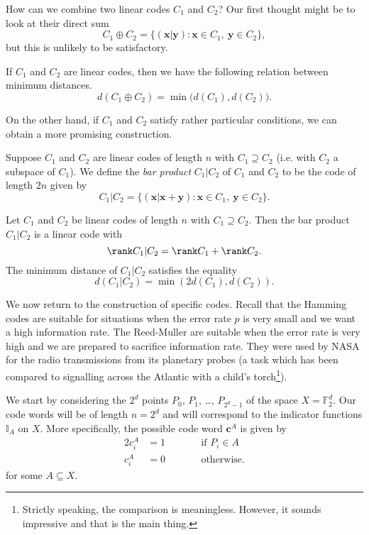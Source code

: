 How can we combine two linear codes $C_{1}$ and $C_{2}$?
Our first thought might be to look at their
direct sum
\[C_{1}\oplus C_{2}=\{({\mathbf x}|{\mathbf y})
:{\mathbf x}\in C_{1},\ {\mathbf y}\in C_{2}\},\]
but this is unlikely to be satisfactory.
\begin{lemma} If $C_{1}$ and $C_{2}$ are linear codes,
then we have the following relation between
minimum distances.
\[d(C_{1}\oplus C_{2})=\min\big(d(C_{1}),d(C_{2})\big).\]
\end{lemma}
On the other hand, if $C_{1}$ and $C_{2}$ satisfy
rather particular conditions, we can obtain
a more promising construction.
\begin{definition} Suppose $C_{1}$ and $C_{2}$
are linear codes of length $n$
with $C_{1}\supseteq C_{2}$
(i.e. with $C_{2}$ a subspace of $C_{1}$). We define
the \emph{bar product} $C_{1}|C_{2}$ of $C_{1}$
and $C_{2}$ to be the code of length $2n$ given by
\[C_{1}|C_{2}=\{({\mathbf x}|{\mathbf x}+{\mathbf y})
:{\mathbf x}\in C_{1},\ {\mathbf y}\in C_{2}\}.\]
\end{definition}
\begin{lemma} Let $C_{1}$ and $C_{2}$
be linear codes of length $n$
with $C_{1}\supseteq C_{2}$. Then
the bar product $C_{1}|C_{2}$
is a linear code with
\[\rank C_{1}|C_{2}=\rank C_{1}+\rank C_{2}.\]
The minimum distance of $C_{1}|C_{2}$ satisfies
the equality
\[d(C_{1}|C_{2})=\min(2d(C_{1}),d(C_{2})).\]
\end{lemma}
We now return to the construction of specific codes.
Recall that the Hamming codes are suitable for situations
when the error rate $p$ is very small and we want
a high information rate. The Reed-Muller are suitable
when the error rate is very high and we are prepared
to sacrifice information rate. They were used by NASA
for the radio transmissions from its planetary probes
(a task which has been compared
to signalling across
the Atlantic with a child's torch\footnote{Strictly
speaking, the comparison is meaningless. However,
it sounds impressive and that is the main thing.}).

We start by considering the $2^{d}$ points $P_{0}$, $P_{1}$,
\dots, $P_{2^{d}-1}$ of the space
$X={\mathbb F}_{2}^{d}$. Our code
words will be of length $n=2^{d}$ and will
correspond to the indicator functions
${\mathbb I}_{A}$ on $X$. More specifically,
the possible code word ${\mathbf c}^{A}$ is given
by
\begin{alignat*}{2}
c_{i}^{A}&=1&&\qquad\text{if $P_{i}\in A$}\\
c_{i}^{A}&=0&&\qquad\text{otherwise}.
\end{alignat*}
for some $A\subseteq X$.

